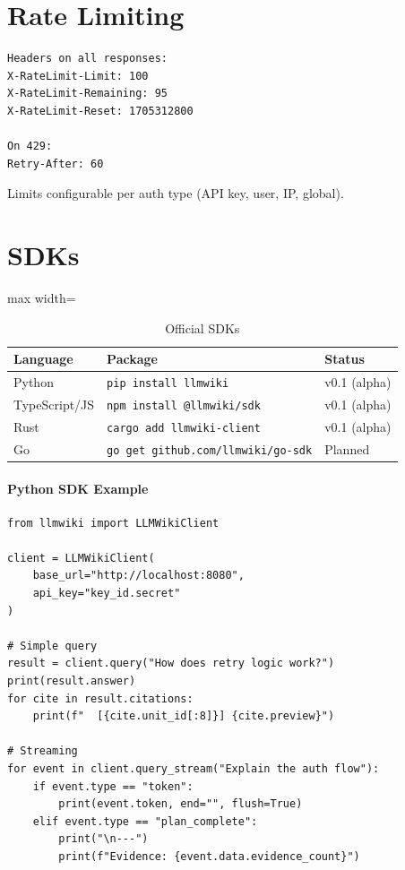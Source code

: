 \section{Rate Limiting}
\label{sec:api:ratelimit}

\begin{verbatim}
Headers on all responses:
X-RateLimit-Limit: 100
X-RateLimit-Remaining: 95
X-RateLimit-Reset: 1705312800

On 429:
Retry-After: 60
\end{verbatim}

Limits configurable per auth type (API key, user, IP, global).

\section{SDKs}
\label{sec:api:sdks}

\begin{table}[htbp]
\centering
\caption{Official SDKs}
\label{tab:api:sdks}
\begin{adjustbox}{max width=\textwidth}
\begin{tabular}{lll}
\toprule
\textbf{Language} & \textbf{Package} & \textbf{Status} \\
\midrule
Python & \texttt{pip install llmwiki} & v0.1 (alpha) \\
TypeScript/JS & \texttt{npm install @llmwiki/sdk} & v0.1 (alpha) \\
Rust & \texttt{cargo add llmwiki-client} & v0.1 (alpha) \\
Go & \texttt{go get github.com/llmwiki/go-sdk} & Planned \\
\bottomrule
\end{tabular}
\end{adjustbox}
\end{table}

\paragraph{Python SDK Example}
\begin{verbatim}
from llmwiki import LLMWikiClient

client = LLMWikiClient(
    base_url="http://localhost:8080",
    api_key="key_id.secret"
)

# Simple query
result = client.query("How does retry logic work?")
print(result.answer)
for cite in result.citations:
    print(f"  [{cite.unit_id[:8]}] {cite.preview}")

# Streaming
for event in client.query_stream("Explain the auth flow"):
    if event.type == "token":
        print(event.token, end="", flush=True)
    elif event.type == "plan_complete":
        print("\n---")
        print(f"Evidence: {event.data.evidence_count}")
\end{verbatim}

